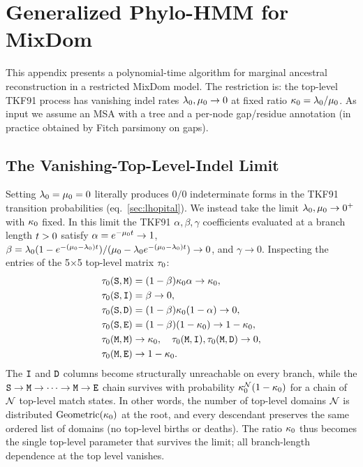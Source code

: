 
\section{Generalized Phylo-HMM for MixDom}
\label{sec:partition-recon}

This appendix presents a polynomial-time algorithm for marginal ancestral
reconstruction in a restricted MixDom model. The restriction is:
the top-level TKF91 process has vanishing indel rates
$\lambda_0, \mu_0 \to 0$ at fixed ratio
$\kappa_0 = \lambda_0 / \mu_0$.
As input we assume an MSA with a tree and a per-node gap/residue
annotation (in practice obtained by Fitch parsimony on gaps).

\subsection{The Vanishing-Top-Level-Indel Limit}
\label{sec:vanishing-top}

Setting $\lambda_0 = \mu_0 = 0$ literally produces
$0/0$ indeterminate forms in the TKF91 transition probabilities
(eq.~\ref{sec:lhopital}). We instead take the limit
$\lambda_0, \mu_0 \to 0^+$ with $\kappa_0$ fixed.
In this limit the TKF91 $\alpha, \beta, \gamma$ coefficients
evaluated at a branch length $t > 0$ satisfy
$\alpha = e^{-\mu_0 t} \to 1$,
$\beta = \lambda_0(1-e^{-(\mu_0 - \lambda_0)t})/
(\mu_0 - \lambda_0 e^{-(\mu_0-\lambda_0)t}) \to 0$, and
$\gamma \to 0$. Inspecting the entries of the 5$\times$5 top-level
matrix $\tau_0$:
\begin{align*}
  \tau_0({\tt S},{\tt M}) &= (1-\beta)\kappa_0\alpha \to \kappa_0, \\
  \tau_0({\tt S},{\tt I}) &= \beta \to 0, \\
  \tau_0({\tt S},{\tt D}) &= (1-\beta)\kappa_0(1-\alpha) \to 0, \\
  \tau_0({\tt S},{\tt E}) &= (1-\beta)(1-\kappa_0) \to 1-\kappa_0, \\
  \tau_0({\tt M},{\tt M}) &\to \kappa_0, \quad
  \tau_0({\tt M},{\tt I}), \tau_0({\tt M},{\tt D}) \to 0, \\
  \tau_0({\tt M},{\tt E}) &\to 1-\kappa_0.
\end{align*}
The ${\tt I}$ and ${\tt D}$ columns become structurally unreachable on every
branch, while the ${\tt S} \to {\tt M} \to \dots \to {\tt M} \to {\tt E}$ chain
survives with probability $\kappa_0^{\mathcal{N}}(1-\kappa_0)$ for a
chain of $\mathcal{N}$ top-level match states. In other words, the number of
top-level domains $\mathcal{N}$ is distributed ${\mbox{Geometric}}(\kappa_0)$ at
the root, and every descendant preserves the same ordered list of
domains (no top-level births or deaths). The ratio $\kappa_0$ thus
becomes the single top-level parameter that survives the limit; all
branch-length dependence at the top level vanishes.

